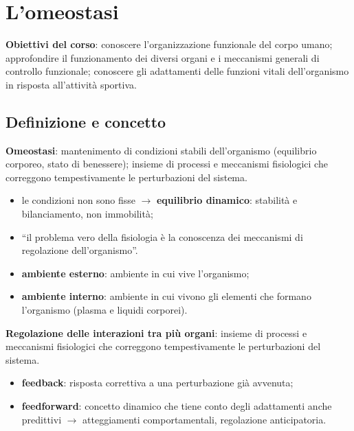 \chapter{L'omeostasi}

\textbf{Obiettivi del corso}: conoscere l'organizzazione funzionale del corpo umano; approfondire
il funzionamento dei diversi organi e i meccanismi generali di controllo funzionale; conoscere gli
adattamenti delle funzioni vitali dell'organismo in risposta all'attività sportiva.

\section{Definizione e concetto}

\textbf{Omeostasi}: mantenimento di condizioni stabili dell'organismo (equilibrio corporeo, stato
di benessere); insieme di processi e meccanismi fisiologici che correggono tempestivamente le
perturbazioni del sistema.
\begin{itemize}
  \item le condizioni non sono fisse $\rightarrow$ \textbf{equilibrio dinamico}: stabilità e
    bilanciamento, non immobilità;
  \item ``il problema vero della fisiologia è la conoscenza dei meccanismi di regolazione
    dell'organismo''.
\end{itemize}

\begin{itemize}
  \item \textbf{ambiente esterno}: ambiente in cui vive l'organismo;
  \item \textbf{ambiente interno}: ambiente in cui vivono gli elementi che formano l'organismo
    (plasma e liquidi corporei).
\end{itemize}

\textbf{Regolazione delle interazioni tra più organi}: insieme di processi e meccanismi fisiologici
che correggono tempestivamente le perturbazioni del sistema.
\begin{itemize}
  \item \textbf{feedback}: risposta correttiva a una perturbazione già avvenuta;
  \item \textbf{feedforward}: concetto dinamico che tiene conto degli adattamenti anche predittivi
    $\rightarrow$ atteggiamenti comportamentali, regolazione anticipatoria.
\end{itemize}


